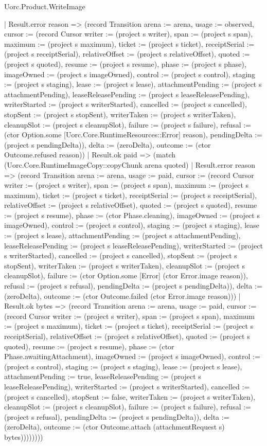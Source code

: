 \begin{lexlean}{Uorc.Product.WriteImage}
\begin{semanticmodule}
{            | Result.error reason => (record Transition {arena := arena, usage := observed, cursor := (record Cursor {writer := (project s writer), span := (project s span), maximum := (project s maximum), ticket := (project s ticket), receiptSerial := (project s receiptSerial), relativeOffset := (project s relativeOffset), quoted := (project s quoted), resume := (project s resume), phase := (project s phase), imageOwned := (project s imageOwned), control := (project s control), staging := (project s staging), lease := (project s lease), attachmentPending := (project s attachmentPending), leaseReleasePending := (project s leaseReleasePending), writerStarted := (project s writerStarted), cancelled := (project s cancelled), stopSent := (project s stopSent), writerTaken := (project s writerTaken), cleanupSlot := (project s cleanupSlot), failure := (project s failure), refusal := (ctor Option.some [Uorc.Core.RuntimeResources::Error] reason), pendingDelta := (project s pendingDelta)}), delta := (zeroDelta), outcome := (ctor Outcome.refused reason)})
            | Result.ok paid => (match (Uorc.Core.RuntimeImageCopy::copyChunk arena quoted)
              | Result.error reason => (record Transition {arena := arena, usage := paid, cursor := (record Cursor {writer := (project s writer), span := (project s span), maximum := (project s maximum), ticket := (project s ticket), receiptSerial := (project s receiptSerial), relativeOffset := (project s relativeOffset), quoted := (project s quoted), resume := (project s resume), phase := (ctor Phase.cleaning), imageOwned := (project s imageOwned), control := (project s control), staging := (project s staging), lease := (project s lease), attachmentPending := (project s attachmentPending), leaseReleasePending := (project s leaseReleasePending), writerStarted := (project s writerStarted), cancelled := (project s cancelled), stopSent := (project s stopSent), writerTaken := (project s writerTaken), cleanupSlot := (project s cleanupSlot), failure := (ctor Option.some [Error] (ctor Error.image reason)), refusal := (project s refusal), pendingDelta := (project s pendingDelta)}), delta := (zeroDelta), outcome := (ctor Outcome.failed (ctor Error.image reason))})
              | Result.ok bytes => (record Transition {arena := arena, usage := paid, cursor := (record Cursor {writer := (project s writer), span := (project s span), maximum := (project s maximum), ticket := (project s ticket), receiptSerial := (project s receiptSerial), relativeOffset := (project s relativeOffset), quoted := (project s quoted), resume := (project s resume), phase := (ctor Phase.awaitingAttachment), imageOwned := (project s imageOwned), control := (project s control), staging := (project s staging), lease := (project s lease), attachmentPending := true, leaseReleasePending := (project s leaseReleasePending), writerStarted := (project s writerStarted), cancelled := (project s cancelled), stopSent := false, writerTaken := (project s writerTaken), cleanupSlot := (project s cleanupSlot), failure := (project s failure), refusal := (project s refusal), pendingDelta := (project s pendingDelta)}), delta := (zeroDelta), outcome := (ctor Outcome.attach (attachmentRequest s) bytes)})))))))
}
\end{semanticmodule}
\end{lexlean}
